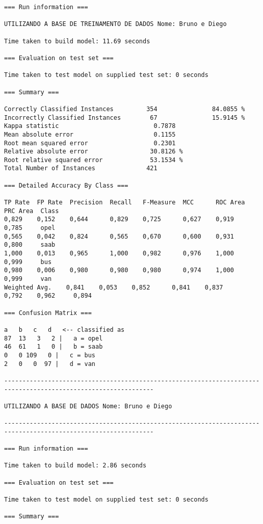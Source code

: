 \documentclass[
	article,			%
	11pt,				%
	oneside,			%
	a4paper,			%
	english,			%
	brazil,				%
	sumario=tradicional
	]{abntex2}
\begin{document}
\begin{lstlisting}
=== Run information ===

UTILIZANDO A BASE DE TREINAMENTO DE DADOS Nome: Bruno e Diego

Time taken to build model: 11.69 seconds

=== Evaluation on test set ===

Time taken to test model on supplied test set: 0 seconds

=== Summary ===

Correctly Classified Instances         354               84.0855 %
Incorrectly Classified Instances        67               15.9145 %
Kappa statistic                          0.7878
Mean absolute error                      0.1155
Root mean squared error                  0.2301
Relative absolute error                 30.8126 %
Root relative squared error             53.1534 %
Total Number of Instances              421     

=== Detailed Accuracy By Class ===

TP Rate  FP Rate  Precision  Recall   F-Measure  MCC      ROC Area  PRC Area  Class
0,829    0,152    0,644      0,829    0,725      0,627    0,919     0,785     opel
0,565    0,042    0,824      0,565    0,670      0,600    0,931     0,800     saab
1,000    0,013    0,965      1,000    0,982      0,976    1,000     0,999     bus
0,980    0,006    0,980      0,980    0,980      0,974    1,000     0,999     van
Weighted Avg.    0,841    0,053    0,852      0,841    0,837      0,792    0,962     0,894     

=== Confusion Matrix ===

a   b   c   d   <-- classified as
87  13   3   2 |   a = opel
46  61   1   0 |   b = saab
0   0 109   0 |   c = bus
2   0   0  97 |   d = van

---------------------------------------------------------------------------------------------------------------

UTILIZANDO A BASE DE DADOS Nome: Bruno e Diego

---------------------------------------------------------------------------------------------------------------

=== Run information ===

Time taken to build model: 2.86 seconds

=== Evaluation on test set ===

Time taken to test model on supplied test set: 0 seconds

=== Summary ===


\end{lstlisting}
\end{document}
